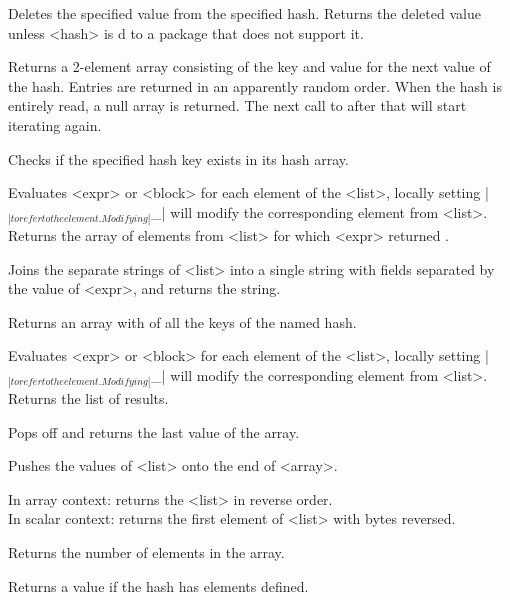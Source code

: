 \begin{enum}{1cm}

Deletes the specified value from the specified hash.
Returns the deleted value unless <hash> is d to a package that
does not support it.

Returns a 2-element array consisting of the key and value for the next
value of the hash. Entries are returned in an apparently
random order. When the hash is entirely read, a null array is
returned. The next call to  after that will start iterating again.

Checks if the specified hash key exists in its hash array.\ddag

Evaluates <expr> or <block> for each element of the <list>, 
locally setting |$_|
to refer to the element. Modifying |$_| will modify the corresponding
element from <list>. Returns the array of elements from <list> for which
<expr> returned \true. 

Joins the separate strings of <list> into a single string with fields
separated by the value of <expr>, and returns the string.

Returns an array with of all the keys of the named hash.

Evaluates <expr> or <block> for each element of the <list>, 
locally setting |$_|
to refer to the element. Modifying |$_| will modify the corresponding
element from <list>. Returns the list of results.\ddag

Pops off and returns the last value of the array.

Pushes the values of <list> onto the end of <array>.

In array context: returns the <list> in reverse order. \\
In scalar
context: returns the first element of <list> with bytes reversed. 

Returns the number of elements in the array.

Returns a \true{} value if the hash has elements defined.


\end{enum}
